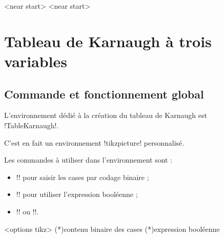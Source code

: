 \documentclass[french,a4paper,11pt]{article}
\begin{document}
{{\begin{DemoCode}[]
\begin{GrapheMPM}[CouleurFleches=brown,CouleurDurees=purple,Police=\large\ttfamily]
	<near start>
	<near start>
\end{GrapheMPM}
\end{DemoCode}

\pagebreak

\section{Tableau de Karnaugh à trois variables}

\subsection{Commande et fonctionnement global}

\begin{cautionblock}
L'environnement dédié à la création du tableau de Karnaugh est \motcletex!TableKarnaugh!.

C'est en fait un environnement \motcletex!tikzpicture! personnalisé.

\smallskip

Les commandes à utiliser dans l'environnement sont :

\begin{itemize}
	\item \motcletex!\KarnaughCasesResult! pour saisir les cases par codage binaire ;
	\item \motcletex!\KarnaughCasesAuto! pour utiliser l'expression booléenne ;
	\item \motcletex!\KarnaughBlocRegroup! ou \motcletex!\KarnaughBlocRegroupAuto!.
\end{itemize}
\vspace*{-\baselineskip}\leavevmode
\end{cautionblock}

\begin{DemoCode}
\begin{TableKarnaugh}[clés]<options tikz>
	\KarnaughCasesResult(*){contenu binaire des cases} %
	\KarnaughCasesAuto(*){expression booléenne} %
\end{TableKarnaugh}
\end{DemoCode}
%

}}
\end{document}
